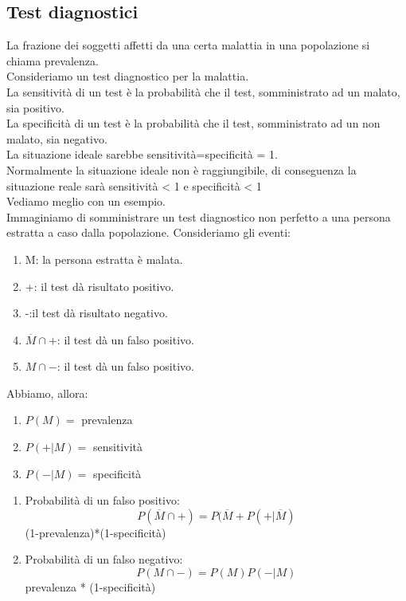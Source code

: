\documentclass{article}
\begin{document}
\subsection{Test diagnostici}
La frazione dei soggetti affetti da una certa  malattia in una popolazione si chiama prevalenza.\\
Consideriamo un test diagnostico per la malattia.\\
La sensitività di un test è la probabilità che il test, somministrato ad un malato, sia positivo.\\
La specificità di un test è la probabilità che  il test, somministrato ad un non malato, sia negativo.\\
La situazione ideale sarebbe sensitività=specificità = 1.\\
Normalmente la situazione ideale non è raggiungibile, di conseguenza la situazione reale sarà sensitività < 1 e specificità < 1\\
Vediamo meglio con un esempio.\\
Immaginiamo di somministrare un test diagnostico non perfetto a una persona estratta a caso dalla popolazione. Consideriamo gli eventi:
\begin{enumerate}
  \item  M: la persona estratta è malata.
  \item +: il test dà risultato positivo.
  \item -:il test dà risultato negativo.
  \item ${\overline{M}}\cap{+}$: il test dà un falso positivo.
  \item${M}\cap{-}$: il test dà un falso positivo.
\end{enumerate}
Abbiamo, allora:
\begin{enumerate}
  \item $P(M) = $ prevalenza
  \item $P(+|M) = $ sensitività
  \item $P(-|M) = $ specificità
\end{enumerate}
\begin{enumerate}
  \item Probabilità di un falso positivo:
  \begin{equation}
    P(\overline{M}\cap{+}) = P(\overline{M}+P(+|\overline{M})
  \end{equation}
  (1-prevalenza)*(1-specificità)
  \item Probabilità di un falso negativo:
  \begin{equation}
    P({M}\cap{-}) = P(M)P(-|M)
  \end{equation}
  prevalenza * (1-specificità)
\end{enumerate}
\end{document}
